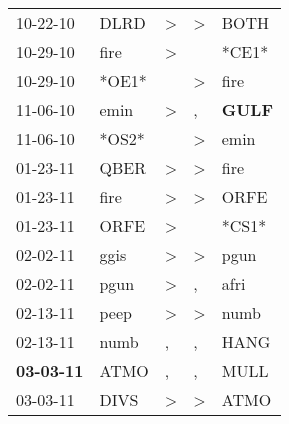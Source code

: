 \begin{supertabular}{p{0.07\textwidth}p{0.06\textwidth}p{0.02\textwidth}p{0.02\textwidth}p{0.06\textwidth}}
          10-22-10\textsuperscript{} &           DLRD\textsuperscript{} &     \textgreater &     \textgreater &           BOTH\textsuperscript{} \\
          10-29-10\textsuperscript{} &           fire\textsuperscript{} &     \textgreater &                  &                            *CE1* \\
          10-29-10\textsuperscript{} &                            *OE1* &                  &     \textgreater &           fire\textsuperscript{} \\
          11-06-10\textsuperscript{} &           emin\textsuperscript{} &     \textgreater &                , &  \textbf{GULF\textsuperscript{}} \\
          11-06-10\textsuperscript{} &                            *OS2* &                  &     \textgreater &           emin\textsuperscript{} \\
          01-23-11\textsuperscript{} &           QBER\textsuperscript{} &     \textgreater &     \textgreater &           fire\textsuperscript{} \\
          01-23-11\textsuperscript{} &           fire\textsuperscript{} &     \textgreater &     \textgreater &           ORFE\textsuperscript{} \\
          01-23-11\textsuperscript{} &           ORFE\textsuperscript{} &     \textgreater &                  &                            *CS1* \\
          02-02-11\textsuperscript{} &           ggis\textsuperscript{} &     \textgreater &     \textgreater &           pgun\textsuperscript{} \\
          02-02-11\textsuperscript{} &           pgun\textsuperscript{} &     \textgreater &                , &           afri\textsuperscript{} \\
          02-13-11\textsuperscript{} &           peep\textsuperscript{} &     \textgreater &     \textgreater &           numb\textsuperscript{} \\
          02-13-11\textsuperscript{} &           numb\textsuperscript{} &                , &                , &           HANG\textsuperscript{} \\
 \textbf{03-03-11\textsuperscript{}} &           ATMO\textsuperscript{} &                , &                , &           MULL\textsuperscript{} \\
          03-03-11\textsuperscript{} &           DIVS\textsuperscript{} &     \textgreater &     \textgreater &           ATMO\textsuperscript{} \\

\end{supertabular}
